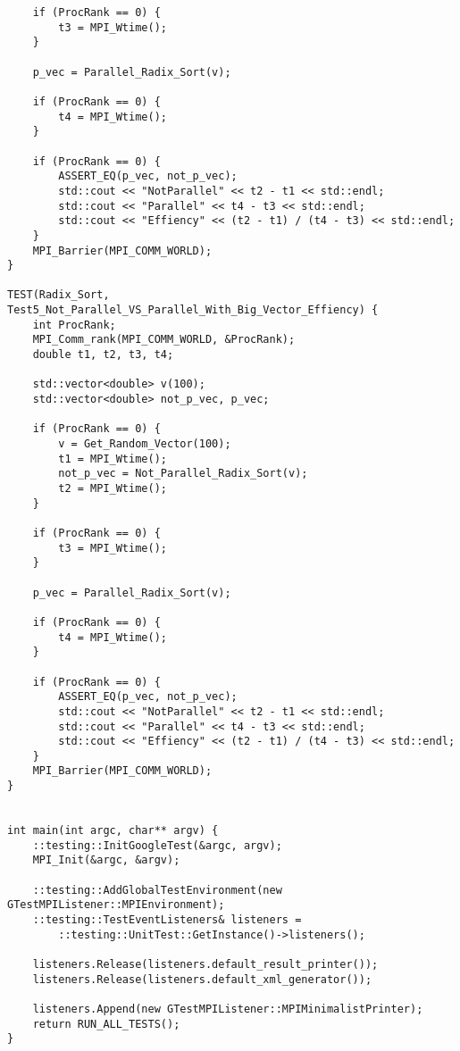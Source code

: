 \documentclass[12pt]{report}
\begin{document}
\begin{lstlisting}
    if (ProcRank == 0) {
        t3 = MPI_Wtime();
    }

    p_vec = Parallel_Radix_Sort(v);

    if (ProcRank == 0) {
        t4 = MPI_Wtime();
    }

    if (ProcRank == 0) {
        ASSERT_EQ(p_vec, not_p_vec);
        std::cout << "NotParallel" << t2 - t1 << std::endl;
        std::cout << "Parallel" << t4 - t3 << std::endl;
        std::cout << "Effiency" << (t2 - t1) / (t4 - t3) << std::endl;
    }
    MPI_Barrier(MPI_COMM_WORLD);
}

TEST(Radix_Sort, Test5_Not_Parallel_VS_Parallel_With_Big_Vector_Effiency) {
    int ProcRank;
    MPI_Comm_rank(MPI_COMM_WORLD, &ProcRank);
    double t1, t2, t3, t4;

    std::vector<double> v(100);
    std::vector<double> not_p_vec, p_vec;

    if (ProcRank == 0) {
        v = Get_Random_Vector(100);
        t1 = MPI_Wtime();
        not_p_vec = Not_Parallel_Radix_Sort(v);
        t2 = MPI_Wtime();
    }

    if (ProcRank == 0) {
        t3 = MPI_Wtime();
    }

    p_vec = Parallel_Radix_Sort(v);

    if (ProcRank == 0) {
        t4 = MPI_Wtime();
    }

    if (ProcRank == 0) {
        ASSERT_EQ(p_vec, not_p_vec);
        std::cout << "NotParallel" << t2 - t1 << std::endl;
        std::cout << "Parallel" << t4 - t3 << std::endl;
        std::cout << "Effiency" << (t2 - t1) / (t4 - t3) << std::endl;
    }
    MPI_Barrier(MPI_COMM_WORLD);
}


int main(int argc, char** argv) {
    ::testing::InitGoogleTest(&argc, argv);
    MPI_Init(&argc, &argv);

    ::testing::AddGlobalTestEnvironment(new GTestMPIListener::MPIEnvironment);
    ::testing::TestEventListeners& listeners =
        ::testing::UnitTest::GetInstance()->listeners();

    listeners.Release(listeners.default_result_printer());
    listeners.Release(listeners.default_xml_generator());

    listeners.Append(new GTestMPIListener::MPIMinimalistPrinter);
    return RUN_ALL_TESTS();
}

\end{lstlisting}
\end{document}
